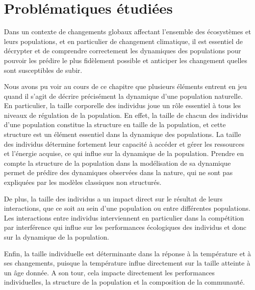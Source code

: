 \section{Problématiques étudiées}

Dans un contexte de changements globaux affectant l'ensemble des écosystèmes et
leurs populations, et en particulier de changement climatique, il est
essentiel de décrypter et de comprendre correctement les dynamiques des
populations pour pouvoir les prédire le plus fidèlement possible et anticiper
les changement quelles sont susceptibles de subir.

Nous avons pu voir au cours de ce chapitre que plusieurs éléments entrent
en jeu quand il s'agit de décrire précisément la dynamique d'une population
naturelle. En particulier, la taille corporelle des individus joue un rôle
essentiel à tous les niveaux de régulation de la population. En effet, la taille
de chacun des individus d'une population constitue la structure en taille de la
population, et cette structure est un élément essentiel dans la
dynamique des populations. La taille des individus détermine fortement
leur capacité à accéder et gérer les ressources et l'énergie acquise, ce qui
influe sur la dynamique de la population. Prendre en compte la structure de la
population dans la modélisation de sa dynamique permet de prédire des dynamiques
observées dans la nature, qui ne sont pas expliquées par les modèles classiques
non structurés.

De plus, la taille des individus a un impact direct sur le résultat de leurs
interactions, que ce soit au sein d'une population ou entre différentes
populations. Les interactions entre individus interviennent en particulier dans
la compétition par interférence qui influe sur les performances écologiques des
individus et donc sur la dynamique de la population. 

Enfin, la taille individuelle est déterminante dans la réponse à la température
et à ses changements, puisque la température influe directement sur la taille
atteinte à un âge donnée. A son tour, cela impacte directement les performances
individuelles, la structure de la population et la composition de la communauté. 

